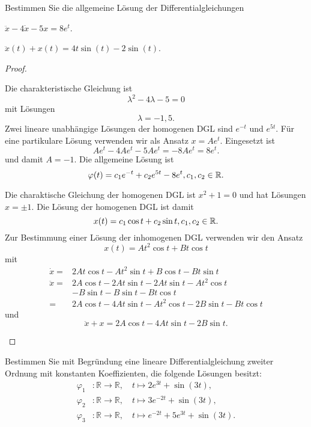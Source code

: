 \begin{Problem}
	Bestimmen Sie die allgemeine Lösung der Differentialgleichungen
	\begin{parts}
		\item $\ddot{x} - 4\dot{x} - 5x = 8e^t$.
		\item $\ddot{x}(t) + x(t) = 4t \sin(t) - 2 \sin(t)$.
	\end{parts}
\end{Problem}
\begin{proof}
	\begin{parts}
	\item Die charakteristische Gleichung ist
\[
\lambda^2 - 4\lambda - 5 = 0
\]
mit L\"{o}sungen
\[
\lambda = -1, 5
.\] 
Zwei lineare unabhängige Lösungen der homogenen DGL sind $e^{-t}$ und $e^{5t}$. F\"{u}r eine partikulare L\"{o}sung verwenden wir als Ansatz $x = Ae^{t}$. Eingesetzt ist
\[
A e^t -4 Ae^t - 5 Ae^t =-8 A e^t = 8e^t	 
.\]
und damit $A=-1$. Die allgemeine L\"{o}sung ist
\[
	\varphi(t) = c_1 e^{-t} + c_2 e^{5t} - 8 e^t, c_1,c_2\in \mathbb{R}
.\] 
\item Die charaktische Gleichung der homogenen DGL ist $x^2 + 1 = 0$ und hat L\"{o}sungen $x=\pm 1$. Die L\"{o}sung der homogenen DGL ist damit
	\[
	x(t) = c_1 \cos t + c_2 \sin t, c_1,c_2\in \mathbb{R}
	.\] 
	Zur Bestimmung einer L\"{o}sung der inhomogenen DGL verwenden wir den Ansatz
	\[
	x(t) = A t^2 \cos t+Bt \cos t
	\]
	mit
	\begin{align*}
		\dot{x}=&2A t \cos t - A t^2 \sin t + B \cos t - Bt\sin t\\
		\ddot{x}=&2A \cos t - 2 At\sin t - 2At\sin t - At^2\cos t\\
			 &-B\sin t - B\sin t -Bt\cos t\\
		=&2A\cos t-4At\sin t - At^2\cos t - 2B\sin t - Bt\cos t
	\end{align*}
	und
	\[
		\ddot{x}+x =2A\cos t - 4At\sin t - 2 B\sin t 
	.\] 
	\end{parts}
\end{proof}
\begin{Problem}
	Bestimmen Sie mit Begründung eine lineare Differentialgleichung zweiter Ordnung mit konstanten Koeffizienten, die folgende Lösungen besitzt:
	\begin{align*}
	\varphi_1 &: \mathbb{R} \to \mathbb{R}, \quad t \mapsto 2e^{3t} + \sin(3t),\\
	\varphi_2 &: \mathbb{R} \to \mathbb{R}, \quad t \mapsto 3e^{-2t} + \sin(3t),\\
	\varphi_3 &: \mathbb{R} \to \mathbb{R}, \quad t \mapsto e^{-2t} + 5e^{3t} + \sin(3t).
	\end{align*}	
\end{Problem}

